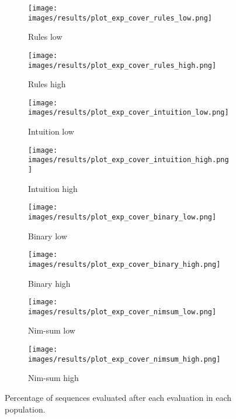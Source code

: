\begin{landscape}
\begin{figure}[ht]
	\begin{subfigure}{0.24\linewidth}
	\centering
	\texttt{[image: images/results/plot\_exp\_cover\_rules\_low.png]}
	\caption{Rules low}
	\label{fig:exp_cover_rules_low}
	\end{subfigure}
	\hfill
	\begin{subfigure}{0.24\linewidth}
	\centering
	\texttt{[image: images/results/plot\_exp\_cover\_rules\_high.png]}
	\caption{Rules high}
	\label{fig:exp_cover_rules_high}
	\end{subfigure}
	\begin{subfigure}{0.24\linewidth}
	\centering
	\texttt{[image: images/results/plot\_exp\_cover\_intuition\_low.png]}
	\caption{Intuition low}
	\label{fig:exp_cover_intuition_low}
	\end{subfigure}
	\hfill
	\begin{subfigure}{0.24\linewidth}
	\centering
	\texttt{[image: images/results/plot\_exp\_cover\_intuition\_high.png]}
	\caption{Intuition high}
	\label{fig:exp_cover_intuition_high}
	\end{subfigure}
	\begin{subfigure}{0.24\linewidth}
	\centering
	\texttt{[image: images/results/plot\_exp\_cover\_binary\_low.png]}
	\caption{Binary low}
	\label{fig:exp_cover_binary_low}
	\end{subfigure}
	\hfill
	\begin{subfigure}{0.24\linewidth}
	\centering
	\texttt{[image: images/results/plot\_exp\_cover\_binary\_high.png]}
	\caption{Binary high}
	\label{fig:exp_cover_binary_high}
	\end{subfigure}
	\begin{subfigure}{0.24\linewidth}
	\centering
	\texttt{[image: images/results/plot\_exp\_cover\_nimsum\_low.png]}
	\caption{Nim-sum low}
	\label{fig:exp_cover_nimsum_low}
	\end{subfigure}
	\hfill
	\begin{subfigure}{0.24\linewidth}
	\centering
	\texttt{[image: images/results/plot\_exp\_cover\_nimsum\_high.png]}
	\caption{Nim-sum high}
	\label{fig:exp_cover_nimsum_high}
	\end{subfigure}
	\caption[Percentage of sequences evaluated]{Percentage of sequences
	evaluated after each evaluation in each population.}
	\label{fig:exp_cover1}
\end{figure}
\end{landscape}

